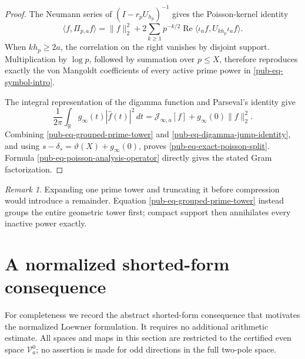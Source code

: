 \documentclass[11pt]{article}
\theoremstyle{remark}
\newtheorem{remark}[theorem]{Remark}
\begin{document}
\begin{proof}
The Neumann series of \((I-r_pU_{h_p})^{-1}\) gives the Poisson-kernel identity
\begin{equation}
 \langle f,\Pi_{p,a}f\rangle
 =\lVert f\rVert_2^2+2\sum_{k\geq1}p^{-k/2}
   \operatorname{Re}\langle\iota_af,U_{kh_p}\iota_af\rangle.
\label{pub-eq-grouped-prime-tower}
\end{equation}
When \(kh_p\geq2a\), the correlation on the right vanishes by disjoint support.
Multiplication by \(\log p\), followed by summation over \(p\leq X\),
therefore reproduces exactly the von Mangoldt coefficients of every active prime power in \eqref{pub-eq-symbol-intro}.

The integral representation of the digamma function and Parseval's identity give
\begin{equation}
 \frac1{2\pi}\int_{\mathbb R}g_\infty(t)|\widehat f(t)|^2\,dt
 =\mathcal J_{\infty,a}[f]+g_\infty(0)\lVert f\rVert_2^2.
\label{pub-eq-digamma-jump-identity}
\end{equation}
Combining \eqref{pub-eq-grouped-prime-tower} and \eqref{pub-eq-digamma-jump-identity},
and using \(s-\delta_s=\vartheta(X)+g_\infty(0)\),
proves \eqref{pub-eq-exact-poisson-split}.
Formula \eqref{pub-eq-poisson-analysis-operator} directly gives the stated Gram factorization.
\end{proof}

\begin{remark}
Expanding one prime tower and truncating it before compression would introduce a remainder.
Equation \eqref{pub-eq-grouped-prime-tower} instead groups the entire geometric tower first;
compact support then annihilates every inactive power exactly.
\end{remark}

\section{A normalized shorted-form consequence}
\label{pub-sec-shorting}

For completeness we record the abstract shorted-form consequence that motivates the normalized Loewner formulation.
It requires no additional arithmetic estimate.
All spaces and maps in this section are restricted to the certified even space \(\mathcal V_a^0\);
no assertion is made for odd directions in the full two-pole space.
\end{document}
